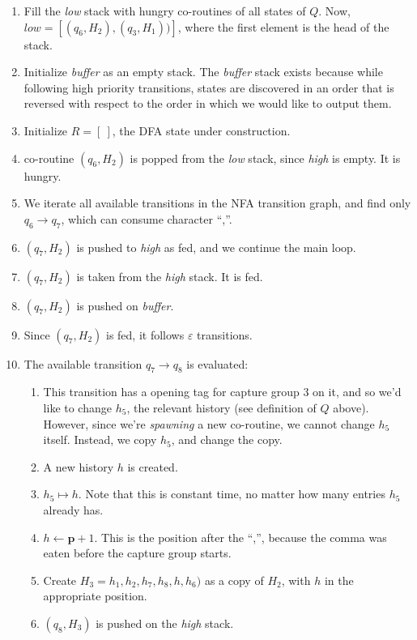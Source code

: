 \documentclass[11pt,a4paper,twoside,openright]{Thesis}
\theoremstyle{definition}
\newcommand{\pos}{\mathbf{\mathbf{p}}}
\begin{document}
\begin{example}
\begin{enumerate}
\item Fill the \emph{low} stack with hungry co-routines of all states of $Q$.
  Now, $\mathit{low}=[(q_6, H_2), (q_3, H_1))]$, where the first element is the
  head of the stack.
\item Initialize \emph{buffer} as an empty stack. 
  The \emph{buffer} stack exists because while following high priority
  transitions, states are discovered in an order that is reversed with respect
  to the order in which we would like to output them.
\item Initialize $R=[\ ]$, the DFA state under construction.
\item co-routine $(q_6,H_2)$ is popped from the \emph{low} stack, since
  \emph{high} is empty. It is hungry.
\item We iterate all available transitions in the NFA transition graph, and
  find only $q_6\rightarrow q_7$, which can consume character ``,''.
\item $(q_7, H_2)$ is pushed to \emph{high} as fed, and we continue the main loop.
\item $(q_7, H_2)$ is taken from the \emph{high} stack. It is fed.
\item $(q_7, H_2)$ is pushed on \emph{buffer}.
\item Since $(q_7, H_2)$ is fed, it follows $\varepsilon$ transitions.
\item The available transition $q_7\rightarrow q_8$ is evaluated:
  \begin{enumerate}
    \item 	This transition has a opening tag for capture group 3 on it, and so we'd like to change $h_5$, 
      the relevant history (see definition of $Q$ above). However, since we're \emph{spawning} a new co-routine, we cannot change $h_5$ itself.
      Instead, we copy $h_5$, and change the copy.
    \item	A new history $h$ is created.
    \item 	$h_5 \mapsto h$. Note that this is constant time, no matter how many entries $h_5$ already has.
    \item 	$h\leftarrow\pos+1$. This is the position after the ``,'', because the comma was eaten before the capture
        group starts.
    \item	Create $H_3 = h_1, h_2, h_7, h_8, h, h_6)$ as a copy of $H_2$, with $h$ in the appropriate position.
    \item $(q_8, H_3)$ is pushed on the \emph{high} stack.

\end{enumerate}
\end{enumerate}
\end{example}
\end{document}
